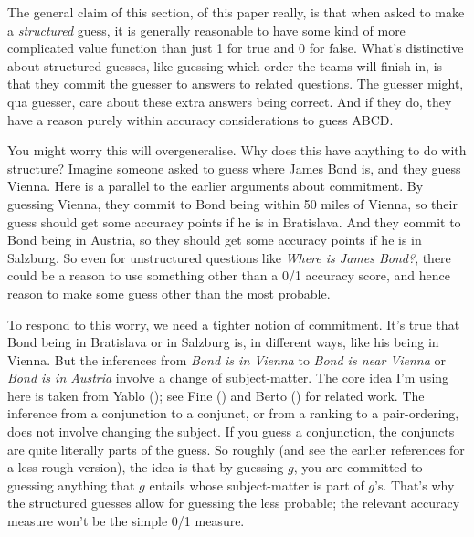 \documentclass[
  11pt,
  letterpaper,
  DIV=11,
  numbers=noendperiod,
  twoside]{scrartcl}
\begin{document}
The general claim of this section, of this paper really, is that when
asked to make a \emph{structured} guess, it is generally reasonable to
have some kind of more complicated value function than just 1 for true
and 0 for false. What's distinctive about structured guesses, like
guessing which order the teams will finish in, is that they commit the
guesser to answers to related questions. The guesser might, qua guesser,
care about these extra answers being correct. And if they do, they have
a reason purely within accuracy considerations to guess ABCD.

You might worry this will overgeneralise. Why does this have anything to
do with structure? Imagine someone asked to guess where James Bond is,
and they guess Vienna. Here is a parallel to the earlier arguments about
commitment. By guessing Vienna, they commit to Bond being within 50
miles of Vienna, so their guess should get some accuracy points if he is
in Bratislava. And they commit to Bond being in Austria, so they should
get some accuracy points if he is in Salzburg. So even for unstructured
questions like \emph{Where is James Bond?}, there could be a reason to
use something other than a 0/1 accuracy score, and hence reason to make
some guess other than the most probable.

To respond to this worry, we need a tighter notion of commitment. It's
true that Bond being in Bratislava or in Salzburg is, in different ways,
like his being in Vienna. But the inferences from \emph{Bond is in
Vienna} to \emph{Bond is near Vienna} or \emph{Bond is in Austria}
involve a change of subject-matter. The core idea I'm using here is
taken from Yablo (); see Fine
() and Berto
() for related work. The inference from a
conjunction to a conjunct, or from a ranking to a pair-ordering, does
not involve changing the subject. If you guess a conjunction, the
conjuncts are quite literally parts of the guess. So roughly (and see
the earlier references for a less rough version), the idea is that by
guessing \(g\), you are committed to guessing anything that \(g\)
entails whose subject-matter is part of \(g\)'s. That's why the
structured guesses allow for guessing the less probable; the relevant
accuracy measure won't be the simple 0/1 measure.
\end{document}
